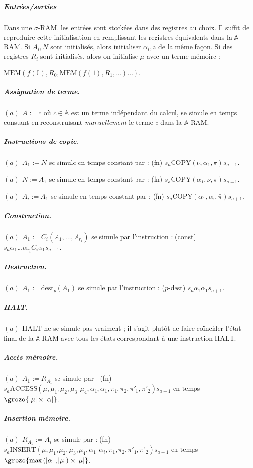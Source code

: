 \documentclass{report}
\newcommand{\bbA}{\mathbb{A}}
\begin{document}
\begin{demo}
						\subparagraph{Entrées/sorties}
						Dans une $\sigma$-RAM, les entrées sont stockées dans des registres au choix. Il suffit de reproduire cette initialisation en remplissant les registres équivalents dans la $\bbA$-RAM. Si $A_i, N$ sont initialisés, alors initialiser $\alpha_i, \nu$ de la même façon. Si des registres $R_i$ sont initialisés, alors on initialise $\mu$ avec un terme mémoire : 
						
						$\text{MEM}\left( f(0), R_0, \text{MEM}\left( f(1), R_1, \dots \right) \dots \right)$.
						
						\subparagraph{Assignation de terme.}
						$(a) \:\: A := c$ où $c \in \bbA$ est un terme indépendant du calcul, se simule en temps constant en reconstruisant \emph{manuellement} le terme $c$ dans la $\bbA$-RAM. 
						
						\subparagraph{Instructions de copie.}
						$(a) \:\: A_1 := N$ se simule en temps constant par : (fn) $s_a \text{COPY}(\nu, \alpha_1, \bar{\pi}) s_{a+1}$.
						 
						$(a) \:\: N := A_1$ se simule en temps constant par : (fn) $s_a \text{COPY}(\alpha_1, \nu, \bar{\pi}) s_{a+1}$.
						
						$(a) \:\: A_i := A_1$ se simule en temps constant par : (fn) $s_a \text{COPY}(\alpha_1, \alpha_i, \bar{\pi}) s_{a+1}$.
					
						\subparagraph{Construction.}
						$(a) \:\: A_1 := C_i(A_1, \dots, A_{r_i})$ se simule par l'instruction : (const) $s_a \alpha_1 \dots \alpha_{r_i} C_i \alpha_1 s_{a+1}$.
						
						\subparagraph{Destruction.}
						$(a) \:\: A_1 := \text{dest}_p(A_1)$ se simule par l'instruction : ($p$-dest) $s_a \alpha_1 \alpha_1 s_{a+1}$.
						
						\subparagraph{HALT.}
						$(a) \:\: \text{HALT}$ ne se simule pas vraiment ; il s'agit plutôt de faire coïncider l'état final de la $\bbA$-RAM avec tous les états correspondant à une instruction $\text{HALT}$. 
						
						\subparagraph{Accès mémoire.}
						$(a) \:\: A_1 := R_{A_1}$ se simule par : (fn) $s_a \text{ACCESS}\left( \mu, \mu_1, \mu_2, \mu_3, \mu_4, \alpha_1, \alpha_1, \pi_1, \pi_2, \pi'_1, \pi'_2\right) s_{a+1}$ en temps $\grozo{\left| \mu \right| \times \left| \alpha \right|}$.
						
						\subparagraph{Insertion mémoire.}
						$(a) \:\: R_{A_1} := A_i$ se simule par : (fn) $s_a \text{INSERT}\left( \mu, \mu_1, \mu_2, \mu_3, \mu_4, \alpha_1, \alpha_i, \pi_1, \pi_2, \pi'_1, \pi'_2\right) s_{a+1}$ en temps $\grozo{\max\left( \left| \alpha \right|, \left| \mu \right| \right)\times \left| \mu \right|}$. 
						

\end{demo}
\end{document}
